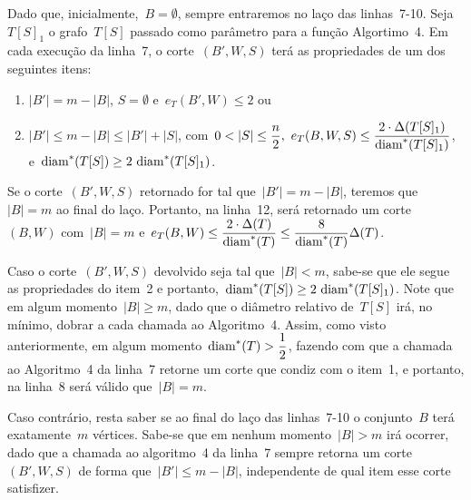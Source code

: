 		



		\bigskip

		Dado que, inicialmente,~$B=\emptyset$, sempre entraremos no laço das
		linhas~7-10.
		Seja~$T[S]_1$ o grafo~$T[S]$ passado como parâmetro para a função Algortimo~4.
		Em cada execução da linha~7, o corte~$(B',W,S)$
		terá as propriedades de um dos seguintes itens:
		\begin{enumerate}
			\item $|B'|=m-|B|$, $S=\emptyset$ e~$e_T(B',W)\le 2$ ou
			\item ${|B'|\le m-|B|\le |B'|+|S|}$, 
				com~${0<|S|\le\dfrac{n}{2},\
				e_T(B,W,S)\le \dfrac{2\cdot 
				\Delta(T[S]_1)}{\diam^*(T[S]_1)}}$, 
				e~${\diam^*(T[S])\ge 2\ \diam^*(T[S]_1)}$.
		\end{enumerate} 
		Se o corte~$(B',W,S)$ 
		retornado for tal que~$|B'| = m-|B|$, teremos que~${|B|=m}$
		ao final do laço.
		Portanto, na linha~12, será retornado um corte~$(B,W)$ 
		com~$|B| = m$ e~$e_T(B,W) \le \dfrac{2\cdot 
			\Delta(T)}{\mathrm{diam}^*(T)}\le \dfrac{8}{\mathrm{diam}^*(T)}\Delta(T)$.

		Caso o corte~$(B',W,S)$ devolvido seja tal que~$|B|<m$,
		sabe-se que ele segue as propriedades do item~2
		e portanto,~${\diam^*(T[S])\ge 2\ \diam^*(T[S]_1)}$.
		Note que em algum momento~$|B|\ge m$,
		dado que o diâmetro relativo de~$T[S]$ irá, no mínimo,
		dobrar a cada chamada ao Algoritmo~4.
		Assim, como visto anteriormente,
		em algum momento~$\mathrm{diam}^*(T)>\dfrac{1}{2}$, fazendo
		com que a chamada ao Algoritmo~4 da linha~7 retorne um corte
		que condiz com o item~1, e portanto, na linha~8 será válido 
		que~$|B| = m$.
		
		Caso contrário, resta saber se ao final do laço das linhas~7-10
		o conjunto~$B$ terá 
		exatamente~$m$ vértices.
		Sabe-se que em nenhum momento~$|B|>m$ irá ocorrer, dado que a chamada ao algoritmo~4
		da linha~7 sempre retorna um corte~$(B',W,S)$ de forma que~$|B'|\le m-|B|$,
		independente de qual item esse corte satisfizer.


